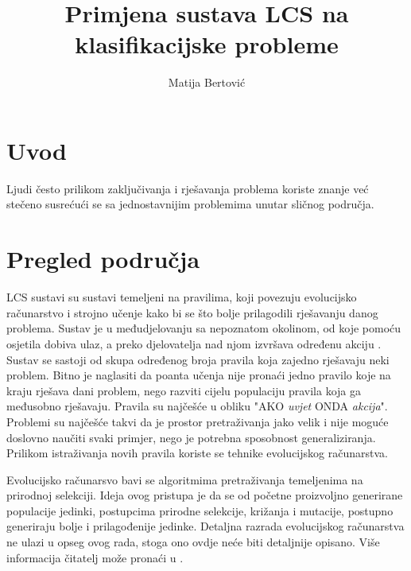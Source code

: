 \documentclass[times, utf8, zavrsni]{fer}
\begin{document}

\title{Primjena sustava LCS na klasifikacijske probleme}

\author{Matija Bertović}

\maketitle

\izvornik

\zahvala{}

\tableofcontents

\chapter{Uvod}
Ljudi često prilikom zaključivanja i rješavanja problema koriste znanje već stečeno susrećući se sa jednostavnijim problemima unutar sličnog područja.


\chapter{Pregled područja}
LCS  sustavi su sustavi temeljeni na pravilima, koji povezuju evolucijsko računarstvo i strojno učenje kako bi se što bolje prilagodili rješavanju danog problema.
Sustav je u međudjelovanju sa nepoznatom okolinom, od koje pomoću osjetila dobiva ulaz, a preko djelovatelja nad njom izvršava određenu akciju \citep{4}.
Sustav se sastoji od skupa određenog broja pravila koja zajedno rješavaju neki problem.
Bitno je naglasiti da poanta učenja nije pronaći jedno pravilo koje na kraju rješava dani problem, nego razviti cijelu populaciju pravila koja ga međusobno rješavaju.
Pravila su najčešće u obliku "AKO \emph{uvjet} ONDA \emph{akcija}".
Problemi su najčešće takvi da je prostor pretraživanja jako velik i nije moguće doslovno naučiti svaki primjer, nego je potrebna sposobnost generaliziranja.
Prilikom istraživanja novih pravila koriste se tehnike evolucijskog računarstva.

Evolucijsko računarsvo bavi se algoritmima pretraživanja temeljenima na prirodnoj selekciji.
Ideja ovog pristupa je da se od početne proizvoljno generirane populacije jedinki, postupcima prirodne selekcije, križanja i mutacije, postupno generiraju bolje i prilagođenije jedinke.
Detaljna razrada evolucijskog računarstva ne ulazi u opseg ovog rada, stoga ono ovdje neće biti detaljnije opisano.
Više informacija čitatelj može pronaći u \citep{6}.
\end{document}
